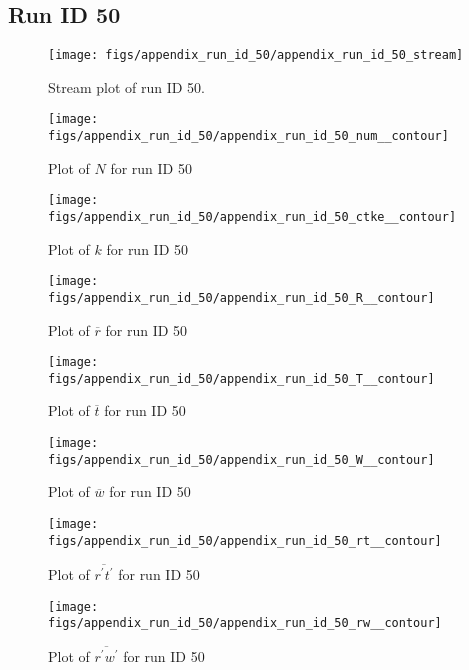 \subsection{Run ID 50}
\begin{figure}[H]
\centering
\texttt{[image: figs/appendix\_run\_id\_50/appendix\_run\_id\_50\_stream]}
\caption{Stream plot of run ID 50.}
\label{fig:appendix_run_id_50_stream}
\end{figure}


\begin{figure}[H]
\centering
\texttt{[image: figs/appendix\_run\_id\_50/appendix\_run\_id\_50\_num\_\_contour]}
\caption{Plot of $N$ for run ID 50}
\label{fig:appendix_run_id_50_num__contour}
\end{figure}


\begin{figure}[H]
\centering
\texttt{[image: figs/appendix\_run\_id\_50/appendix\_run\_id\_50\_ctke\_\_contour]}
\caption{Plot of $k$ for run ID 50}
\label{fig:appendix_run_id_50_ctke__contour}
\end{figure}


\begin{figure}[H]
\centering
\texttt{[image: figs/appendix\_run\_id\_50/appendix\_run\_id\_50\_R\_\_contour]}
\caption{Plot of $\overline{r}$ for run ID 50}
\label{fig:appendix_run_id_50_R__contour}
\end{figure}


\begin{figure}[H]
\centering
\texttt{[image: figs/appendix\_run\_id\_50/appendix\_run\_id\_50\_T\_\_contour]}
\caption{Plot of $\overline{t}$ for run ID 50}
\label{fig:appendix_run_id_50_T__contour}
\end{figure}


\begin{figure}[H]
\centering
\texttt{[image: figs/appendix\_run\_id\_50/appendix\_run\_id\_50\_W\_\_contour]}
\caption{Plot of $\overline{w}$ for run ID 50}
\label{fig:appendix_run_id_50_W__contour}
\end{figure}


\begin{figure}[H]
\centering
\texttt{[image: figs/appendix\_run\_id\_50/appendix\_run\_id\_50\_rt\_\_contour]}
\caption{Plot of $\overline{r^\prime t^\prime}$ for run ID 50}
\label{fig:appendix_run_id_50_rt__contour}
\end{figure}


\begin{figure}[H]
\centering
\texttt{[image: figs/appendix\_run\_id\_50/appendix\_run\_id\_50\_rw\_\_contour]}
\caption{Plot of $\overline{r^\prime w^\prime}$ for run ID 50}
\label{fig:appendix_run_id_50_rw__contour}
\end{figure}


